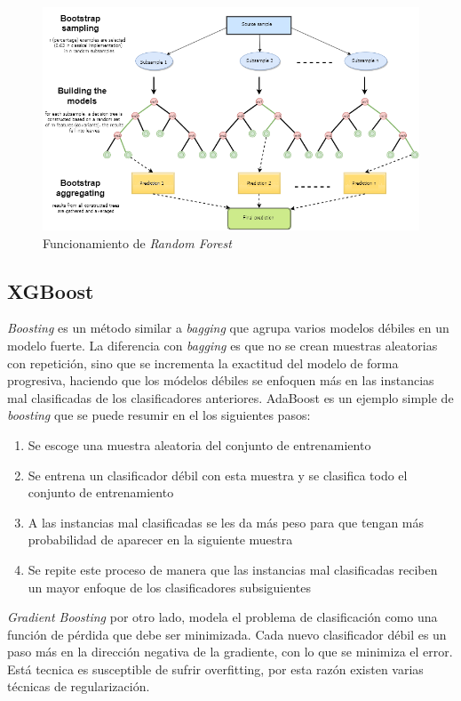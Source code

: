 \begin{figure}[htbp]
	\centering
	\includegraphics[width=\linewidth]{graficos/rf.png}
	\caption{Funcionamiento de \textit{Random Forest} \citep{mql5:rf}}
	\label{fig:rf}
\end{figure}


\subsection{XGBoost}

\textit{Boosting} es un método similar a \textit{bagging} que agrupa varios modelos débiles en un modelo fuerte. La diferencia con \textit{bagging} es que no se crean muestras aleatorias con repetición, sino que se incrementa la exactitud del modelo de forma progresiva, haciendo que los módelos débiles se enfoquen más en las instancias mal clasificadas de los clasificadores anteriores. AdaBoost es un ejemplo simple de \textit{boosting} que se puede resumir en el los siguientes pasos:

\begin{enumerate}
	\item Se escoge una muestra aleatoria del conjunto de entrenamiento
	\item Se entrena un clasificador débil con esta muestra y se clasifica todo el conjunto de entrenamiento
	\item A las instancias mal clasificadas se les da más peso para que tengan más probabilidad de aparecer en la siguiente muestra
	\item Se repite este proceso de manera que las instancias mal clasificadas reciben un mayor enfoque de los clasificadores subsiguientes
\end{enumerate}

\textit{Gradient Boosting} por otro lado, modela el problema de clasificación como una función de pérdida que debe ser minimizada. Cada nuevo clasificador débil es un paso más en la dirección negativa de la gradiente, con lo que se minimiza el error. Está tecnica es susceptible de sufrir overfitting, por esta razón existen varias técnicas de regularización.

